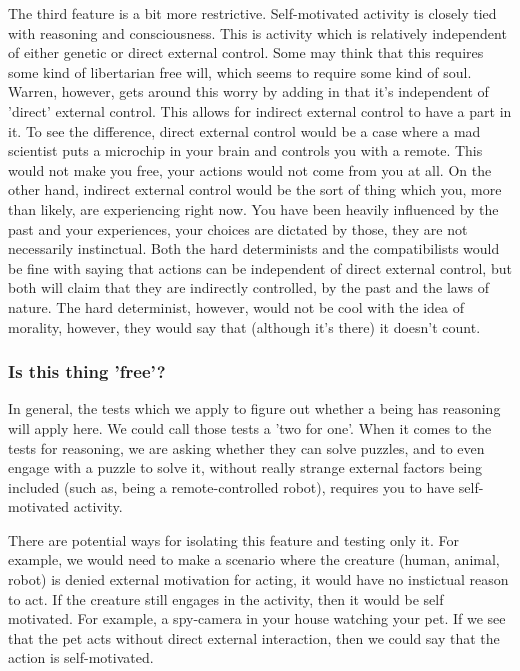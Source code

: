 The third feature is a bit more restrictive. Self-motivated activity is closely tied with reasoning and consciousness. This is activity which is relatively independent of either genetic or direct external control. Some may think that this requires some kind of libertarian free will, which seems to require some kind of soul. Warren, however, gets around this worry by adding in that it's independent of 'direct' external control. This allows for indirect external control to have a part in it. To see the difference, direct external control would be a case where a mad scientist puts a microchip in your brain and controls you with a remote. This would not make you free, your actions would not come from you at all. On the other hand, indirect external control would be the sort of thing which you, more than likely, are experiencing right now. You have been heavily influenced by the past and your experiences, your choices are dictated by those, they are not necessarily instinctual. Both the hard determinists and the compatibilists would be fine with saying that actions can be independent of direct external control, but both will claim that they are indirectly controlled, by the past and the laws of nature. The hard determinist, however, would not be cool with the idea of morality, however, they would say that (although it's there) it doesn't count.

\subsubsection{Is this thing 'free'?}

In general, the tests which we apply to figure out whether a being has reasoning will apply here. We could call those tests a 'two for one'. When it comes to the tests for reasoning, we are asking whether they can solve puzzles, and to even engage with a puzzle to solve it, without really strange external factors being included (such as, being a remote-controlled robot), requires you to have self-motivated activity.

There are potential ways for isolating this feature and testing only it. For example, we would need to make a scenario where the creature (human, animal, robot) is denied external motivation for acting, it would have no instictual reason to act. If the creature still engages in the activity, then it would be self motivated. For example, a spy-camera in your house watching your pet. If we see that the pet acts without direct external interaction, then we could say that the action is self-motivated. 



